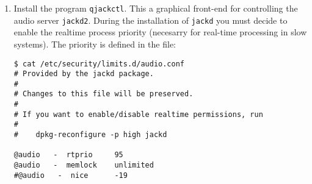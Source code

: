 \begin{enumerate}
  

  

\item Install the program \texttt{qjackctl}. This a graphical
  front-end for controlling the audio server \texttt{jackd2}. During
  the installation of \texttt{jackd} you must decide to enable the
  realtime process priority (necesarry for real-time processing in
  slow systems). The priority is defined in the file:

\begin{verbatim}
$ cat /etc/security/limits.d/audio.conf 
# Provided by the jackd package.
#
# Changes to this file will be preserved.
#
# If you want to enable/disable realtime permissions, run
#
#    dpkg-reconfigure -p high jackd

@audio   -  rtprio     95
@audio   -  memlock    unlimited
#@audio   -  nice      -19
\end{verbatim}

\end{enumerate}



